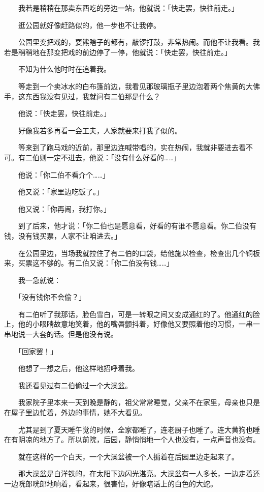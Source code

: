 \documentclass[UTF8]{ctexart}
\begin{document}
　　我若是稍稍在那卖东西吃的旁边一站，他就说：「快走罢，快往前走。」

　　逛公园就好像赶路似的，他一步也不让我停。

　　公园里变把戏的，耍熊瞎子的都有，敲锣打鼓，非常热闹。而他不让我看。我若是稍稍地在那变把戏的前边停了一停，他就说：「快走罢，快往前走。」

　　不知为什么他时时在追着我。

　　等走到一个卖冰水的白布篷前边，我看见那玻璃瓶子里边泡着两个焦黄的大佛手，这东西我没有见过，我就问有二伯那是什么？

　　他说：「快走罢，快往前走。」

　　好像我若多再看一会工夫，人家就要来打我了似的。

　　等来到了跑马戏的近前，那里边连喊带唱的，实在热闹，我就非要进去看不可。有二伯则一定不进去，他说：「没有什么好看的……」

　　他说：「你二伯不看介个……」

　　他又说：「家里边吃饭了。」

　　他又说：「你再闹，我打你。」

　　到了后来，他才说：「你二伯也是愿意看，好看的有谁不愿意看。你二伯没有钱，没有钱买票，人家不让咱进去。」

　　在公园里边，当场我就拉住了有二伯的口袋，给他施以检查，检查出几个铜板来，买票这不够的。有二伯又说：「你二伯没有钱……」

　　我一急就说：

　　「没有钱你不会偷？」

　　有二伯听了我那话，脸色雪白，可是一转眼之间又变成通红的了。他通红的脸上，他的小眼睛故意地笑着，他的嘴唇颤抖着，好像他又要照着他的习惯，一串一串地说一大套的话。但是他没有说。

　　「回家罢！」

　　他想了一想之后，他这样地招呼着我。

　　我还看见过有二伯偷过一个大澡盆。

　　我家院子里本来一天到晚是静的，祖父常常睡觉，父亲不在家里，母亲也只是在屋子里边忙着，外边的事情，她不大看见。

　　尤其是到了夏天睡午觉的时候，全家都睡了，连老厨子也睡了。连大黄狗也睡在有阴凉的地方了。所以前院，后园，静悄悄地一个人也没有，一点声音也没有。

　　就在这样的一个白天，一个大澡盆被一个人掮着在后园里边走起来了。

　　那大澡盆是白洋铁的，在太阳下边闪光湛亮。大澡盆有一人多长，一边走着还一边咣郎咣郎地响着，看起来，很害怕，好像瞎话上的白色的大蛇。
\end{document}
